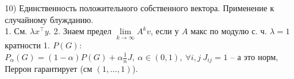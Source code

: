 10) Единственность положительного собственного вектора. Применение к случайному блужданию.\\
1. См. $\lambda x^{\top} y$. 2. Знаем предел $\lim\limits_{k\to\infty}A^kv$, если у $ A $ макс по модулю с. ч. $\lambda=1$ кратности 1. $P(G)$: $P_{\alpha}(G)=(1-\alpha) P(G) + \alpha\tfrac{1}{n}J,\ \alpha \in (0,1),\ \forall i,j\ J_{ij}=1 $ -- а это норм, Перрон гарантирует (см $(1,\ldots, 1)$).\\
